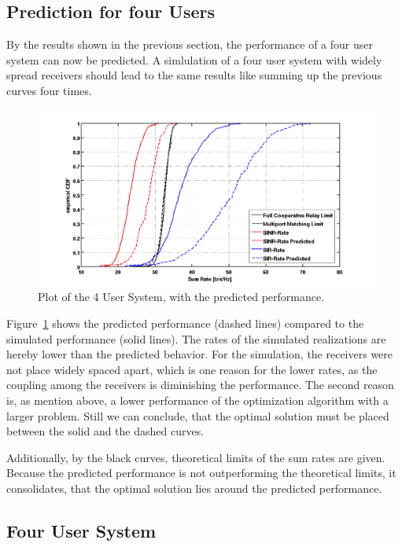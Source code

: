 \subsection{Prediction for four Users}
\label{sec:const_prediction}

By the results shown in the previous section, the performance of a four user system can now be predicted.
A simlulation of a four user system with widely spread receivers should lead to the same results like summing up the previous curves four times.
\begin{figure}[h]
\centering
  \includegraphics[width=0.9\linewidth]{images/4user_inklpred.png}
\caption{Plot of the 4 User System, with the predicted performance.}
\label{fig:4user_pred}
\end{figure}

Figure~\ref{fig:4user_pred} shows the predicted performance (dashed lines) compared to the simulated performance (solid lines).
The rates of the simulated realizations are hereby lower than the predicted behavior.
For the simulation, the receivers were not place widely spaced apart, which is one reason for the lower rates, as the coupling among the receivers is diminishing the performance.
The second reason is, as mention above, a lower performance of the optimization algorithm with a larger problem.
Still we can conclude, that the optimal solution must be placed between the solid and the dashed curves.

Additionally, by the black curves, theoretical limits of the sum rates are given.
Because the predicted performance is not outperforming the theoretical limits, it consolidates, that the optimal solution lies around the predicted performance.



\subsection{Four User System}
\label{sec:4user_const}

